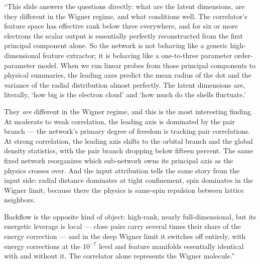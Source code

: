 \documentclass[11pt]{article}
\begin{document}
\begin{say}
``This slide answers the questions directly: what are the latent dimensions, are they different in
the Wigner regime, and what conditions well. The correlator's feature space has effective rank below
three everywhere, and for six or more electrons the scalar output is essentially perfectly
reconstructed from the first principal component alone. So the network is not behaving like a generic
high-dimensional feature extractor; it is behaving like a one-to-three parameter order-parameter
model. When we run linear probes from those principal components to physical summaries, the leading
axes predict the mean radius of the dot and the variance of the radial distribution almost perfectly.
The latent dimensions are, literally, `how big is the electron cloud' and `how much do the shells
fluctuate.'

They \emph{are} different in the Wigner regime, and this is the most interesting finding. At moderate
to weak correlation, the leading axis is dominated by the pair branch --- the network's primary
degree of freedom is tracking pair correlations. At strong correlation, the leading axis shifts to
the orbital branch and the global density statistics, with the pair branch dropping below fifteen
percent. The same fixed network reorganizes which sub-network owns its principal axis as the physics
crosses over. And the input attribution tells the same story from the input side: radial distance
dominates at tight confinement, spin dominates in the Wigner limit, because there the physics is
same-spin repulsion between lattice neighbors.

Backflow is the opposite kind of object: high-rank, nearly full-dimensional, but its energetic
leverage is local --- close pairs carry several times their share of the energy correction --- and in
the deep Wigner limit it switches off entirely, with energy corrections at the $10^{-7}$ level and
feature manifolds essentially identical with and without it. The correlator alone represents the
Wigner molecule.''
\end{say}
\end{document}
